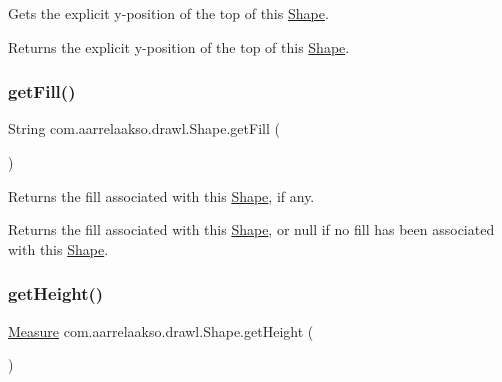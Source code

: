 Gets the explicit y-\/position of the top of this \hyperlink{classcom_1_1aarrelaakso_1_1drawl_1_1_shape}{Shape}. 

\begin{DoxyReturn}{Returns}
the explicit y-\/position of the top of this \hyperlink{classcom_1_1aarrelaakso_1_1drawl_1_1_shape}{Shape}. 
\end{DoxyReturn}
\mbox{\label{classcom_1_1aarrelaakso_1_1drawl_1_1_shape_a0d9a33a3e151aaceeec140bea343a650}} 
\subsubsection{\texorpdfstring{get\+Fill()}{getFill()}}
{\footnotesize\ttfamily String com.\+aarrelaakso.\+drawl.\+Shape.\+get\+Fill (\begin{DoxyParamCaption}{ }\end{DoxyParamCaption})\hspace{0.3cm}{\ttfamily [inherited]}}



Returns the fill associated with this \hyperlink{classcom_1_1aarrelaakso_1_1drawl_1_1_shape}{Shape}, if any. 

\begin{DoxyReturn}{Returns}
the fill associated with this \hyperlink{classcom_1_1aarrelaakso_1_1drawl_1_1_shape}{Shape}, or null if no fill has been associated with this \hyperlink{classcom_1_1aarrelaakso_1_1drawl_1_1_shape}{Shape}. 
\end{DoxyReturn}
\mbox{\label{classcom_1_1aarrelaakso_1_1drawl_1_1_shape_ac9f74d31c332aab76b329edc22080e67}} 
\subsubsection{\texorpdfstring{get\+Height()}{getHeight()}}
{\footnotesize\ttfamily \hyperlink{classcom_1_1aarrelaakso_1_1drawl_1_1_measure}{Measure} com.\+aarrelaakso.\+drawl.\+Shape.\+get\+Height (\begin{DoxyParamCaption}{ }\end{DoxyParamCaption})\hspace{0.3cm}{\ttfamily [inherited]}}



